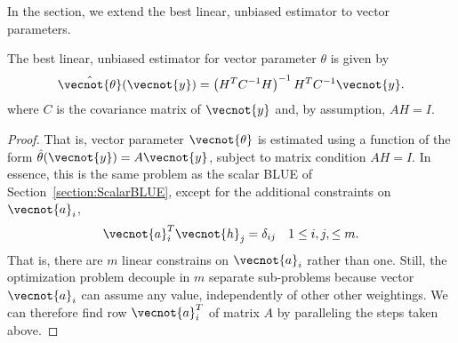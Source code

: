 In the section, we extend the best linear, unbiased estimator to vector parameters.

\begin{proposition} \label{proposition:VectorBLUE}
The best linear, unbiased estimator for vector parameter $\theta$ is given by
\begin{equation} \label{equation:VectorBLUE}
\hat{\vecnot{\theta}} (\vecnot{y})
= \left( H^T C^{-1} H \right)^{-1} H^T C^{-1} \vecnot{y} .
\end{equation}
where $C$ is the covariance matrix of $\vecnot{y}$ and, by assumption, $A H = I$.
\end{proposition}
\begin{proof}
That is, vector parameter $\vecnot{\theta}$ is estimated using a function of the form $\hat{\theta} (\vecnot{y}) = A \vecnot{y}$, subject to matrix condition $AH = I$.
In essence, this is the same problem as the scalar BLUE of Section~\ref{section:ScalarBLUE}, except for the additional constraints on $\vecnot{a}_i$,
\begin{equation*} \label{equation:VectorBlueUnbias}
\vecnot{a}_i^T \vecnot{h}_j = \delta_{ij}  \quad 1 \leq i, j, \leq m .
\end{equation*}
That is, there are $m$ linear constrains on $\vecnot{a}_i$ rather than one.
Still, the optimization problem decouple in $m$ separate sub-problems because vector $\vecnot{a}_i$ can assume any value, independently of other other weightings.
We can therefore find row $\vecnot{a}_i^T$ of matrix $A$ by paralleling the steps taken above.


\end{proof}
